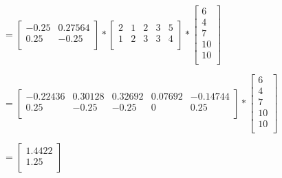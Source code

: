 \documentclass[12pt]{article}
\begin{document}
\begin{enumerate}
  $= \begin{bmatrix}
    -0.25 & 0.27564 \\
    0.25 & -0.25 \\
    \end{bmatrix} *
    \begin{bmatrix}
      2 & 1 & 2 & 3 & 5 \\
      1 & 2 & 3 & 3 & 4 \\
    \end{bmatrix} *
    \begin{bmatrix}
      6 \\
      4 \\
      7 \\
      10 \\
      10 \\
    \end{bmatrix}$

  $= \begin{bmatrix}
      -0.22436 & 0.30128 & 0.32692 & 0.07692 & -0.14744 \\
      0.25 & -0.25 & -0.25 & 0 & 0.25 \\
    \end{bmatrix} *
    \begin{bmatrix}
      6 \\
      4 \\
      7 \\
      10 \\
      10 \\
    \end{bmatrix}$

  $= \begin{bmatrix}
    1.4422 \\
    1.25 \\
  \end{bmatrix}$

\end{enumerate}
\end{document}

